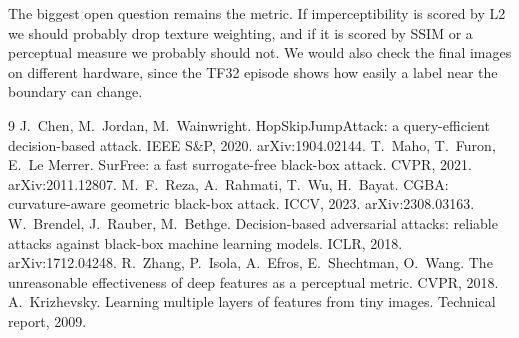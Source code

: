 \documentclass[11pt]{article}
\begin{document}
The biggest open question remains the metric. If imperceptibility is scored by L2 we should probably drop texture weighting, and if it is scored by SSIM or a perceptual measure we probably should not. We would also check the final images on different hardware, since the TF32 episode shows how easily a label near the boundary can change.

\footnotesize
\setlength{\parskip}{0em}
\begin{thebibliography}{9}
 J.~Chen, M.~Jordan, M.~Wainwright. HopSkipJumpAttack: a query-efficient decision-based attack. IEEE S\&P, 2020. arXiv:1904.02144.
 T.~Maho, T.~Furon, E.~Le Merrer. SurFree: a fast surrogate-free black-box attack. CVPR, 2021. arXiv:2011.12807.
 M.~F.~Reza, A.~Rahmati, T.~Wu, H.~Bayat. CGBA: curvature-aware geometric black-box attack. ICCV, 2023. arXiv:2308.03163.
 W.~Brendel, J.~Rauber, M.~Bethge. Decision-based adversarial attacks: reliable attacks against black-box machine learning models. ICLR, 2018. arXiv:1712.04248.
 R.~Zhang, P.~Isola, A.~Efros, E.~Shechtman, O.~Wang. The unreasonable effectiveness of deep features as a perceptual metric. CVPR, 2018.
 A.~Krizhevsky. Learning multiple layers of features from tiny images. Technical report, 2009.
\end{thebibliography}
\end{document}
